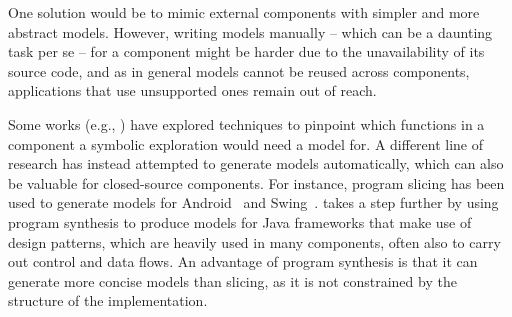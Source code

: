 {%

One solution would be to mimic external components with simpler and more abstract models. However, writing models manually -- which can be a daunting task per se -- for a component might be harder due to the unavailability of its source code,  and as in general models cannot be reused across components, applications that use unsupported ones remain out of reach. 

Some  works (e.g., \cite{AOH-TACAS07,XXT-ICSE11}) have explored techniques to pinpoint which functions in a component a symbolic exploration would need a model for. A different line of research has instead attempted to generate models automatically, which can also be valuable for closed-source components. For instance, program slicing has been used to generate models for Android~\cite{VTV-SEN15} and Swing~\cite{CT-SEN14}. \cite{JQF-ICSE16} takes a step further by using program synthesis to produce models for Java frameworks that make use of design patterns, which are heavily used in many components, often also to carry out control and data flows. An advantage of program synthesis is that it can generate more concise models than slicing, as it is not constrained by the structure of the implementation. %


}